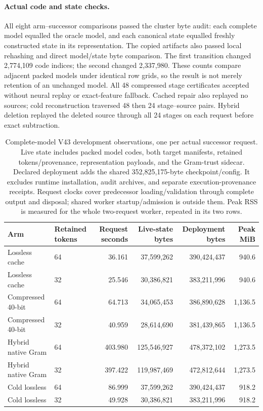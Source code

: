 \documentclass[10pt,twocolumn,letterpaper]{article}
\begin{document}
\paragraph{Actual code and state checks.}
All eight arm--successor comparisons passed the cluster byte audit: each complete
model equalled the oracle model, and each canonical state equalled freshly
constructed state in its representation. The copied artifacts also passed local
rehashing and direct model/state byte comparison. The first transition changed
2,774,109 code indices; the second changed 2,337,980. These counts compare adjacent
packed models under identical row grids, so the result is not merely retention of
an unchanged model. All 48 compressed stage certificates accepted without neural
replay or exact-feature fallback. Cached repair also replayed no sources; cold
reconstruction traversed 48 then 24 stage--source pairs. Hybrid deletion replayed
the deleted source through all 24 stages on each request before exact subtraction.

\begin{table}[t]
\centering
\small
\begin{tabular}{llrrrr}
\toprule
Arm & Retained tokens & Request seconds & Live-state bytes & Deployment bytes & Peak MiB\\
\midrule
Lossless cache &64&36.161&37,599,262&390,424,437&940.6\\
Lossless cache &32&25.546&30,386,821&383,211,996&940.6\\
Compressed 40-bit &64&64.713&34,065,453&386,890,628&1,136.5\\
Compressed 40-bit &32&40.959&28,614,690&381,439,865&1,136.5\\
Hybrid native Gram &64&403.980&125,546,927&478,372,102&1,273.5\\
Hybrid native Gram &32&397.422&119,987,469&472,812,644&1,273.5\\
Cold lossless &64&86.999&37,599,262&390,424,437&918.2\\
Cold lossless &32&49.928&30,386,821&383,211,996&918.2\\
\bottomrule
\end{tabular}
\caption{Complete-model V43 development observations, one per actual successor
request. Live state includes packed model codes, both target manifests, retained
tokens/provenance, representation payloads, and the Gram-trust sidecar. Declared
deployment adds the shared 352,825,175-byte checkpoint/config. It excludes runtime
installation, audit archives, and separate execution-provenance receipts. Request
clocks cover predecessor loading/validation through complete output and disposal;
shared worker startup/admission is outside them. Peak RSS is measured for the
whole two-request worker, repeated in its two rows.}
\label{tab:v43}
\end{table}
\end{document}
